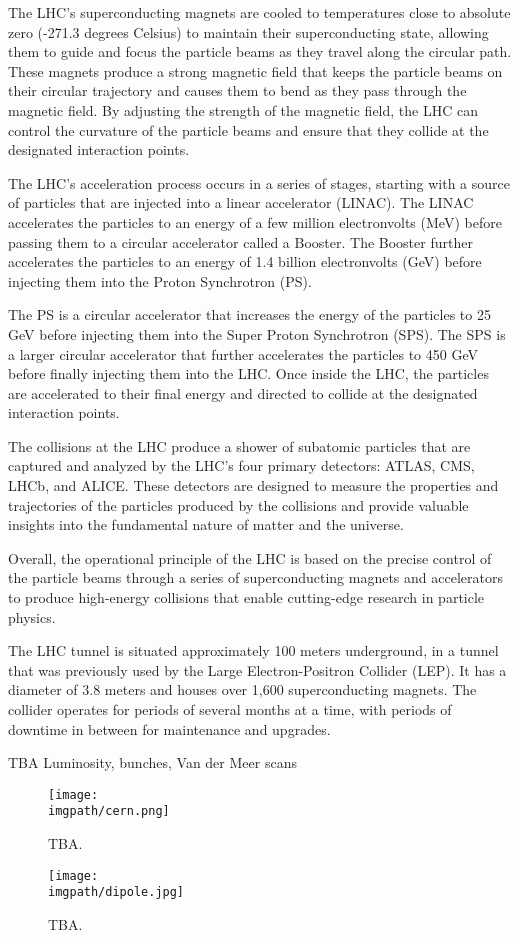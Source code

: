 The LHC's superconducting magnets are cooled to temperatures close to absolute zero (-271.3 degrees Celsius) to maintain their superconducting state, allowing them to guide and focus the particle beams as they travel along the circular path. These magnets produce a strong magnetic field that keeps the particle beams on their circular trajectory and causes them to bend as they pass through the magnetic field. By adjusting the strength of the magnetic field, the LHC can control the curvature of the particle beams and ensure that they collide at the designated interaction points.

The LHC's acceleration process occurs in a series of stages, starting with a source of particles that are injected into a linear accelerator (LINAC). The LINAC accelerates the particles to an energy of a few million electronvolts (MeV) before passing them to a circular accelerator called a Booster. The Booster further accelerates the particles to an energy of 1.4 billion electronvolts (GeV) before injecting them into the Proton Synchrotron (PS).

The PS is a circular accelerator that increases the energy of the particles to 25 GeV before injecting them into the Super Proton Synchrotron (SPS). The SPS is a larger circular accelerator that further accelerates the particles to 450 GeV before finally injecting them into the LHC. Once inside the LHC, the particles are accelerated to their final energy and directed to collide at the designated interaction points.

The collisions at the LHC produce a shower of subatomic particles that are captured and analyzed by the LHC's four primary detectors: ATLAS, CMS, LHCb, and ALICE. These detectors are designed to measure the properties and trajectories of the particles produced by the collisions and provide valuable insights into the fundamental nature of matter and the universe.

Overall, the operational principle of the LHC is based on the precise control of the particle beams through a series of superconducting magnets and accelerators to produce high-energy collisions that enable cutting-edge research in particle physics.

The LHC tunnel is situated approximately 100 meters underground, in a tunnel that was previously used by the Large Electron-Positron Collider (LEP). It has a diameter of 3.8 meters and houses over 1,600 superconducting magnets. The collider operates for periods of several months at a time, with periods of downtime in between for maintenance and upgrades.

TBA Luminosity, bunches, Van der Meer scans

\begin{figure}%
\centering%
\texttt{[image: \\imgpath/cern.png]}
\caption{TBA.}
\label{fig:experiment:cern}
\end{figure}


\begin{figure}%
\centering%
\texttt{[image: \\imgpath/dipole.jpg]}
\caption{TBA.}
\label{fig:experiment:cern}
\end{figure}